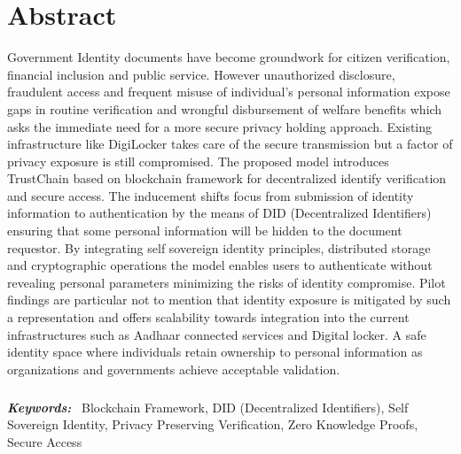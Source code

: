 \chapter*{Abstract}
\sloppy

\vspace{1cm}
\par Government Identity documents have become groundwork for citizen verification, financial inclusion and public service. However unauthorized disclosure, fraudulent access and frequent misuse of individual's personal information expose gaps in routine verification and wrongful disbursement of welfare benefits which asks the immediate need for a more secure privacy holding approach. Existing infrastructure like DigiLocker takes care of the secure transmission but a factor of privacy exposure is still compromised. The proposed model introduces TrustChain based on blockchain framework for decentralized identify verification and secure access. The inducement shifts focus from submission of identity information to authentication by the means of DID (Decentralized Identifiers) ensuring that some personal information will be hidden to the document requestor. By integrating self sovereign identity principles, distributed storage and cryptographic operations the model enables users to authenticate without revealing personal parameters minimizing the risks of identity compromise. Pilot findings are particular not to mention that identity exposure is mitigated by such a representation and offers scalability towards integration into the current infrastructures such as Aadhaar connected services and Digital locker. A safe identity space where individuals retain ownership to personal information as organizations and governments achieve acceptable validation. 

\paragraph{}





\vspace*{0.7cm}
\noindent
{\large{\textbf{\emph{Keywords:}}}}~
Blockchain Framework, DID (Decentralized Identifiers), Self Sovereign Identity, Privacy Preserving Verification, Zero Knowledge Proofs, Secure Access





